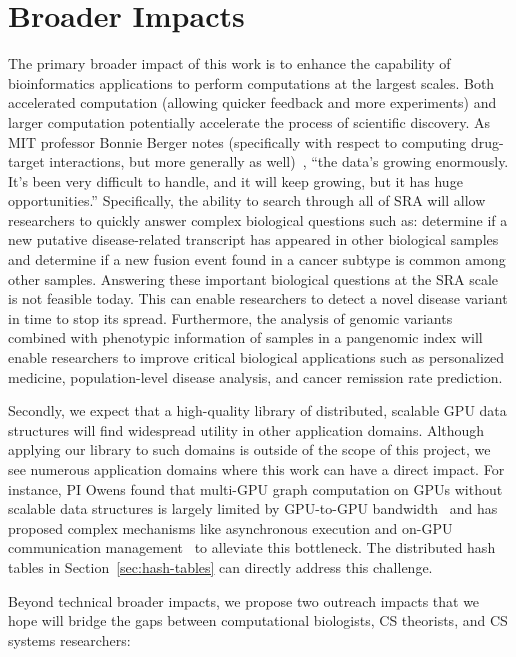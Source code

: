 \section{Broader Impacts}
\label{broadimpacts}

The primary broader impact of this work is to enhance the capability of bioinformatics applications to perform computations at the largest scales. Both accelerated computation (allowing quicker feedback and more experiments) and larger computation potentially accelerate the process of scientific discovery. As MIT professor Bonnie Berger notes (specifically with respect to computing drug-target interactions, but more generally as well)~\cite{Krasilnikova:2022:DDD}, ``the data's growing enormously. It's been very difficult to handle, and it will keep growing, but it has huge opportunities.''
%
Specifically, the ability to search through all of SRA will allow researchers to quickly answer complex biological questions such as: determine if a new putative disease-related transcript has appeared in other biological samples and determine if a new fusion event found in a cancer subtype is common among other samples. Answering these important biological questions at the SRA scale is not feasible today. This can enable researchers to detect a novel disease variant in time to stop its spread.
% 
Furthermore, the analysis of genomic variants combined with phenotypic information of samples in a pangenomic index will enable researchers to improve critical biological applications such as personalized medicine, population-level disease analysis, and cancer remission rate prediction.


Secondly, we expect that a high-quality library of distributed, scalable GPU data structures will find widespread utility in other application domains. Although applying our library to such domains is outside of the scope of this project, we see numerous application domains where this work can have a direct impact. For instance, PI Owens found that multi-GPU graph computation on GPUs without scalable data structures is largely limited by GPU-to-GPU bandwidth~\cite{Pan:2017:MGA} and has proposed complex mechanisms like asynchronous execution and on-GPU communication management~\cite{Chen:2022:SIP} to alleviate this bottleneck. The distributed hash tables in Section~\ref{sec:hash-tables} can directly address this challenge.

Beyond technical broader impacts, we propose two outreach impacts that we hope will bridge the gaps between computational biologists, CS theorists, and CS systems researchers:


